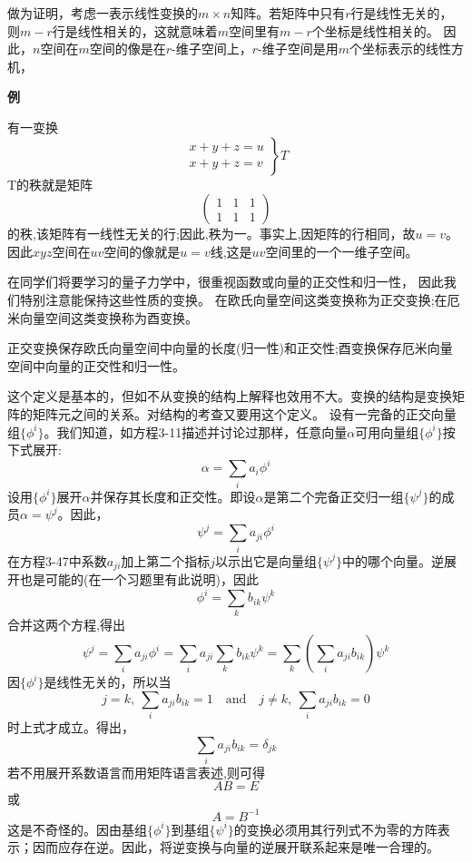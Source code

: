 做为证明，考虑一表示线性变换的$m \times n$知阵。若矩阵中只有$r$行是线性无关的，则$m-r$行是线性相关的，这就意味着$m$空间里有$m-r$个坐标是线性相关的。
因此，$n$空间在$m$空间的像是在$r$-维子空间上，$r$-维子空间是用$m$个坐标表示的线性方机，

\textbf{例}

有一变换
\[
\left .
\begin{array}{c}
    x+y+z=u \\ x+y+z=v
\end{array}
\right \} 
T
\]
T的秩就是矩阵
\[
\begin{pmatrix}
    1 & 1 & 1 \\ 1 & 1 & 1 
\end{pmatrix}  
\]
的秩,该矩阵有一线性无关的行;因此,秩为一。事实上,因矩阵的行相同，故$u=v$。因此$xyz$空间在$uv$空间的像就是$u=v$线,这是$uv$空间里的一个一维子空间。

在同学们将要学习的量子力学中，很重视函数或向量的正交性和归一性， 因此我们特别注意能保持这些性质的变换。
在欧氏向量空间这类变换称为正交变换;在厄米向量空间这类变换称为酉变换。

\begin{definition}[正交变换和酉变换]
    正交变换保存欧氏向量空间中向量的长度(归一性)和正交性;酉变换保存厄米向量空间中向量的正交性和归一性。
\end{definition}

这个定义是基本的，但如不从变换的结构上解释也效用不大。变换的结构是变换矩阵的矩阵元之间的关系。对结构的考查又要用这个定义。
设有一完备的正交向量组$\{\phi^i\}$。我们知道，如方程3-11描述并讨论过那样，任意向量$\alpha$可用向量组$\{\phi^i\}$按下式展开:
\[\alpha=\sum_ia_i\phi^i \tag{3-47}\]
设用$\{\phi^i\}$展开$\alpha$并保存其长度和正交性。即设$\alpha$是第二个完备正交归一组$\{\psi^j\}$的成员$\alpha=\psi^j$。因此，
\[\psi^j=\sum_ia_{ji}\phi^i \tag{3-48}\]
在方程3-47中系数$a_{ji}$加上第二个指标$j$以示出它是向量组$\{\psi^j\}$中的哪个向量。逆展开也是可能的(在一个习题里有此说明)，因此
\[\phi^i=\sum_kb_{ik}\psi^k \tag{3-49}\]
合并这两个方程,得出
\[\psi^j=\sum_ia_{ji}\phi^i=\sum_ia_{ji}\sum_kb_{ik}\psi^k=\sum_k \left ( \sum_ia_{ji}b_{ik} \right )\psi^k \tag{3-50}\]
因$\{\phi^i\}$是线性无关的，所以当
\[j=k, \ \sum_ia_{ji}b_{ik}=1 \quad \text{and} \quad j \neq k, \ \sum_ia_{ji}b_{ik}=0\]
时上式才成立。得出，
\[\sum_ia_{ji}b_{ik}=\delta_{jk} \tag{3-51}\]
若不用展开系数语言而用矩阵语言表述,则可得
\[AB=E \tag{3-52}\]
或
\[A=B^{-1} \tag{3-53}\]
这是不奇怪的。因由基组$\{\phi^i\}$到基组$\{\psi^i\}$的变换必须用其行列式不为零的方阵表示；因而应存在逆。因此，将逆变换与向量的逆展开联系起来是唯一合理的。

